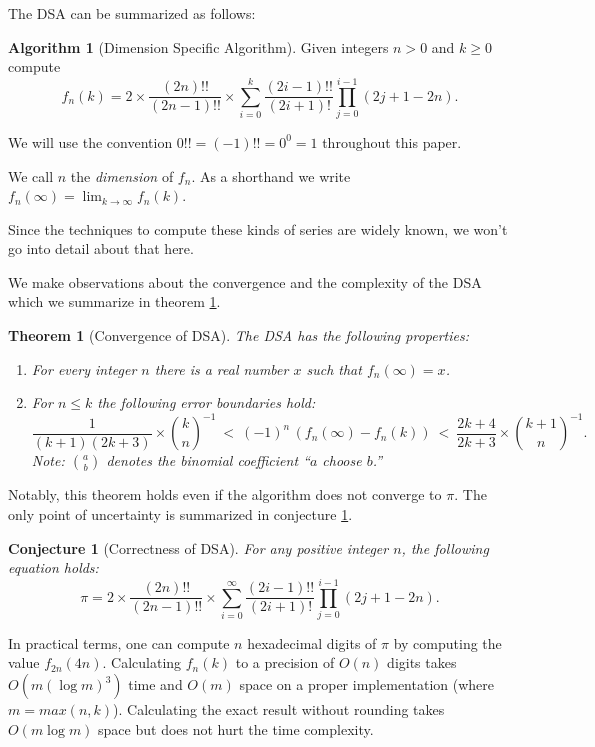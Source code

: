 \documentclass[a4paper,11pt]{scrartcl}
\newcounter{theoremcounter}
\theoremstyle{definition}
\newtheorem{myalgorithm}[theoremcounter]{Algorithm}
\theoremstyle{plain}
\newtheorem{myconjecture}[theoremcounter]{Conjecture}
\newtheorem{mytheorem}[theoremcounter]{Theorem}
\theoremstyle{remark}
\begin{document}
The DSA can be summarized as follows:

\begin{myalgorithm}[Dimension Specific Algorithm]
\label{AlgorithmDSA}
Given integers $n > 0$ and $k \geq 0$ compute
\[
f_n(k) = 2 \times \frac{(2n)!!}{(2n-1)!!} \times \sum_{i=0}^{k} \frac{(2i-1)!!}{(2i+1)!} \prod_{j=0}^{i-1}(2j+1-2n).
\]
\end{myalgorithm}

We will use the convention $0!! = (-1)!! = 0^0 = 1$ throughout this paper.

We call $n$ the \emph{dimension} of $f_n$.
As a shorthand we write $f_n(\infty) = \lim_{k \rightarrow \infty} f_n(k)$.

Since the techniques to compute these kinds of series are widely known, we won't go into detail about that here.

We make observations about the convergence and the complexity of the DSA which we summarize in theorem \ref{TheoremConvergenceDSA}.

\begin{mytheorem}[Convergence of DSA]
\label{TheoremConvergenceDSA}
The DSA has the following properties:
\begin{enumerate}
\item
For every integer $n$ there is a real number $x$ such that $f_n(\infty) = x$.
\item
For $n \leq k$ the following error boundaries hold:
\[
\frac{1}{(k+1)(2k+3)} \times \binom{k}{n}^{-1}
\ < \
(-1)^n \, (f_n(\infty) - f_n(k))
\ < \
\frac{2k+4}{2k+3} \times \binom{k+1}{n}^{-1}. 
\]
Note: $\binom{a}{b}$ denotes the binomial coefficient ``$a$ choose $b$.''
\end{enumerate}
\end{mytheorem}

Notably, this theorem holds even if the algorithm does not converge to $\pi$.
The only point of uncertainty is summarized in conjecture \ref{ConjectureCorrectnessDSA}.

\begin{myconjecture}[Correctness of DSA]
\label{ConjectureCorrectnessDSA}
For any positive integer $n$, the following equation holds:
\[
\pi = 2 \times \frac{(2n)!!}{(2n-1)!!} \times \sum_{i=0}^{\infty} \frac{(2i-1)!!}{(2i+1)!} \prod_{j=0}^{i-1}(2j+1-2n).
\]
\end{myconjecture}

In practical terms, one can compute $n$ hexadecimal digits of $\pi$ by computing the value $f_{2n}(4n)$.
Calculating $f_n(k)$ to a precision of $O(n)$ digits takes $O(m (\log m)^3)$ time and $O(m)$ space on a proper implementation (where $m = max(n,k)$).
Calculating the exact result without rounding takes $O(m \log m)$ space but does not hurt the time complexity.
\end{document}
